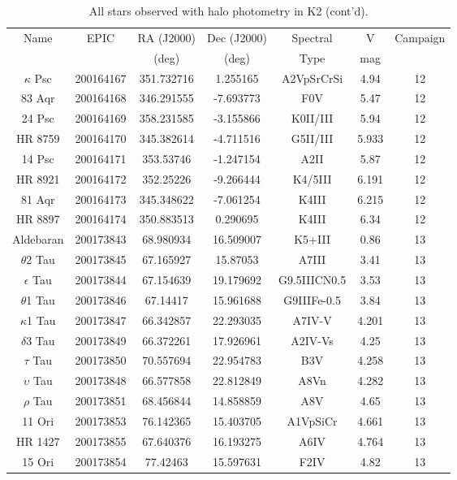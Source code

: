 \begin{table*}
\caption{All stars observed with halo photometry in K2 (cont'd).}
\begin{tabular}{ccccccc}
\hline \hline
Name & EPIC & RA (J2000) & Dec (J2000) & Spectral & V & Campaign \\
 &  & (deg) & (deg) & Type & mag &  \\
\hline
$\kappa$ Psc & 200164167 & 351.732716 & 1.255165 & A2VpSrCrSi & 4.94 & 12 \\
83 Aqr & 200164168 & 346.291555 & -7.693773 & F0V & 5.47 & 12 \\
24 Psc & 200164169 & 358.231585 & -3.155866 & K0II/III & 5.94 & 12 \\
HR 8759 & 200164170 & 345.382614 & -4.711516 & G5II/III & 5.933 & 12 \\
14 Psc & 200164171 & 353.53746 & -1.247154 & A2II & 5.87 & 12 \\
HR 8921 & 200164172 & 352.25226 & -9.266444 & K4/5III & 6.191 & 12 \\
81 Aqr & 200164173 & 345.348622 & -7.061254 & K4III & 6.215 & 12 \\
HR 8897 & 200164174 & 350.883513 & 0.290695 & K4III & 6.34 & 12 \\
Aldebaran & 200173843 & 68.980934 & 16.509007 & K5+III & 0.86 & 13 \\
$\theta$2 Tau & 200173845 & 67.165927 & 15.87053 & A7III & 3.41 & 13 \\
$\epsilon$ Tau & 200173844 & 67.154639 & 19.179692 & G9.5IIICN0.5 & 3.53 & 13 \\
$\theta$1 Tau & 200173846 & 67.14417 & 15.961688 & G9IIIFe-0.5 & 3.84 & 13 \\
$\kappa$1 Tau & 200173847 & 66.342857 & 22.293035 & A7IV-V & 4.201 & 13 \\
$\delta$3 Tau & 200173849 & 66.372261 & 17.926961 & A2IV-Vs & 4.25 & 13 \\
$\tau$ Tau & 200173850 & 70.557694 & 22.954783 & B3V & 4.258 & 13 \\
$\upsilon$ Tau & 200173848 & 66.577858 & 22.812849 & A8Vn & 4.282 & 13 \\
$\rho$ Tau & 200173851 & 68.456844 & 14.858859 & A8V & 4.65 & 13 \\
11 Ori & 200173853 & 76.142365 & 15.403705 & A1VpSiCr & 4.661 & 13 \\
HR 1427 & 200173855 & 67.640376 & 16.193275 & A6IV & 4.764 & 13 \\
15 Ori & 200173854 & 77.42463 & 15.597631 & F2IV & 4.82 & 13 \\

\end{tabular}
\end{table*}
